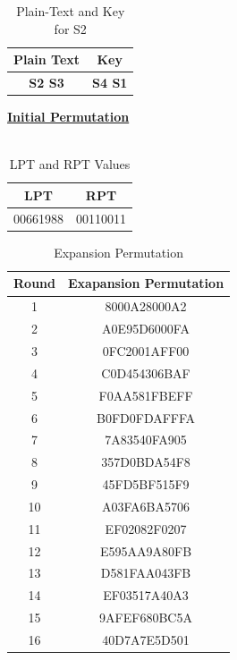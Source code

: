 \documentclass[12pt, letterpaper]{article}
\begin{document}
\begin{table}[h]
    \centering
    \begin{tabular}{|c|c|}
        \hline
          Plain Text & Key \\
        \hline
        \textbf{S2 S3} & \textbf{S4 S1} \\
        \hline
    \end{tabular}
    \caption{Plain-Text and Key for S2}
    \label{tab:text-key}
\end{table}






\underline{\textbf{Initial Permutation}} \\
\\
\begin{table}[h]
    \centering
    \begin{tabular}{|c|c|}
        
        \hline
        LPT & RPT \\
        \hline
        00661988 & 00110011   \\
        \hline
    \end{tabular}
    \caption{LPT and RPT Values}
    \label{tab:lpt-rpt}
\end{table}

\begin{table}[h]
    \centering
    \begin{tabular}{|c|c|}
        
        \hline
        Round & Exapansion Permutation \\
        \hline
        1 & 8000A28000A2   \\
        \hline
        2 & A0E95D6000FA
        \\
        \hline
        3  & 0FC2001AFF00
        \\
         \hline
        4 & C0D454306BAF
        \\
         \hline
        5 & F0AA581FBEFF
        \\
         \hline
        6 & B0FD0FDAFFFA
        \\
         \hline
        7 & 7A83540FA905
        \\
         \hline
        8 & 357D0BDA54F8
        \\
         \hline
        9 & 45FD5BF515F9
        \\
         \hline
        10 & A03FA6BA5706
        \\
         \hline
        11 & EF02082F0207
        \\
         \hline
        12 & E595AA9A80FB
        \\
         \hline
        13 & D581FAA043FB
        \\
         \hline
        14 & EF03517A40A3
        \\
         \hline
        15 & 9AFEF680BC5A
        \\
         \hline
        16 & 40D7A7E5D501
        \\
        \hline
        
    \end{tabular}
    \caption{Expansion Permutation}
    \label{tab:lpt-rpt}
\end{table}
\end{document}
